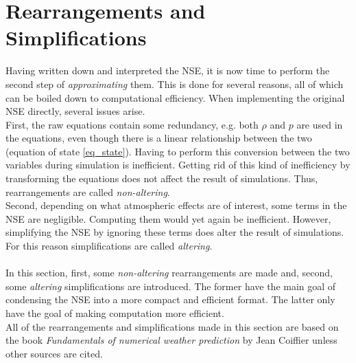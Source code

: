 \section{Rearrangements and Simplifications}
Having written down and interpreted the NSE, it is now time to perform the second step of \emph{approximating} them.
This is done for several reasons, all of which can be boiled down to computational efficiency.
When implementing the original NSE directly, several issues arise.
\\
First, the raw equations contain some redundancy, e.g. both $\rho$ and $p$ are used in the equations, even though there is a linear relationship between the two (equation of state \ref{eq_state}).
Having to perform this conversion between the two variables during simulation is inefficient.
Getting rid of this kind of inefficiency by transforming the equations does not affect the result of simulations.
Thus, rearrangements are called \emph{non-altering}.
\\
Second, depending on what atmospheric effects are of interest, some terms in the NSE are negligible.
Computing them would yet again be inefficient.
However, simplifying the NSE by ignoring these terms does alter the result of simulations.
For this reason simplifications are called \emph{altering}.
\\
\\
In this section, first, some \emph{non-altering} rearrangements are made and, second, some \emph{altering} simplifications are introduced.
The former have the main goal of condensing the NSE into a more compact and efficient format.
The latter only have the goal of making computation more efficient.\\
All of the rearrangements and simplifications made in this section are based on the book \emph{Fundamentals of numerical weather prediction} by Jean Coiffier\cite{coiffier2011fundamentals} unless other sources are cited.


